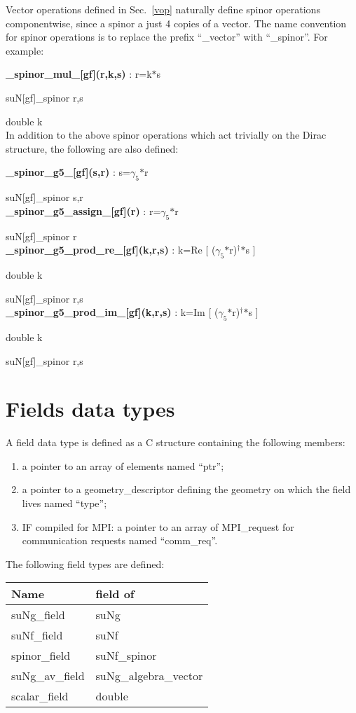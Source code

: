 \documentclass[10pt]{article}
\begin{document}
Vector operations defined in Sec.~\ref{vop} naturally define spinor operations componentwise, since a spinor a just 4 copies of a vector.
The name convention for spinor operations is to replace the prefix ``\_vector'' with ``\_spinor''. For example:

\noindent\textbf{\_spinor\_mul\_[gf](r,k,s) } : r=k$*$s

suN[gf]\_spinor r,s

double k\\

In addition to the above spinor operations which act trivially on the Dirac structure, the following are also defined:


\noindent\textbf{\_spinor\_g5\_[gf](s,r) } : s=$\gamma_5$$*$r 

suN[gf]\_spinor s,r\\


\noindent\textbf{\_spinor\_g5\_assign\_[gf](r) } : r=$\gamma_5$$*$r 

suN[gf]\_spinor r\\


\noindent\textbf{\_spinor\_g5\_prod\_re\_[gf](k,r,s) } : k=Re [ ($\gamma_5$$*$r)$^\dagger$$*$s ]

double k

suN[gf]\_spinor r,s\\


\noindent\textbf{\_spinor\_g5\_prod\_im\_[gf](k,r,s) } : k=Im [ ($\gamma_5$$*$r)$^\dagger$$*$s ]

double k

suN[gf]\_spinor r,s

\section{Fields data types\label{fields}}

A field data type is defined as a C structure containing the following members:
\begin{enumerate}
\item a pointer to an array of elements named ``ptr'';
\item a pointer to a geometry\_descriptor defining the geometry on which the field lives named ``type'';
\item IF compiled for MPI: a pointer to an array of MPI\_request for communication requests named ``comm\_req''.
\end{enumerate}
The following field types are defined:
\begin{center}
\begin{tabular}{ll}
\hline
Name & field of \\  
\hline
\hline
suNg\_field & suNg \\
suNf\_field & suNf \\
spinor\_field & suNf\_spinor \\
suNg\_av\_field & suNg\_algebra\_vector \\
scalar\_field & double
\end{tabular}
\end{center}
\end{document}
